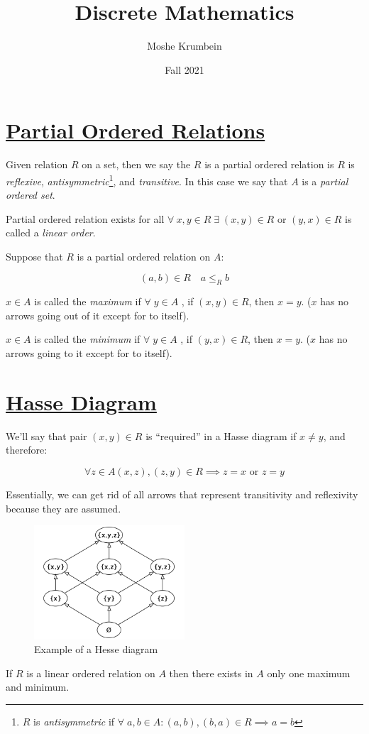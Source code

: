 \documentclass[00_complete]{subfiles}
\title{Discrete Mathematics}
\author{Moshe Krumbein}
\date{Fall 2021}
\begin{document}

\section{\href{https://en.wikipedia.org/wiki/Partially_ordered_set\#Partial_order_relation}{Partial Ordered Relations}}

Given relation \(R\) on a set, then we say the \(R\) is a partial
ordered relation is \(R\) is \emph{reflexive},
\emph{antisymmetric}\footnote{\(R\) is \emph{antisymmetric} if
  \(\forall \; a,b \in A: (a,b), (b,a) \in R \implies  a=b\)}, and
  \emph{transitive}. In this case we say that \(A\) is a \emph{partial
ordered set}.

\begin{definition}
Partial ordered relation exists for all
\(\forall \: x,y \in R \;\exists\; (x,y) \in R\) or \((y,x) \in R\) is
called a \emph{linear order}.
\end{definition}

Suppose that \(R\) is a partial ordered relation on \(A\):

\[(a,b) \in R \quad a \leq_R b\]

\(x \in A\) is called the \emph{maximum} if \(\forall \; y \in A\) , if
\((x,y) \in R\), then \(x=y\). (\(x\) has no arrows going out of it
except for to itself).

\(x \in A\) is called the \emph{minimum} if \(\forall \; y \in A\) , if
\((y,x) \in R\), then \(x=y\). (\(x\) has no arrows going to it except
for to itself).

\section{\href{https://en.wikipedia.org/wiki/Hasse_diagram}{Hasse
Diagram}}

We'll say that pair \((x,y) \in R\) is ``required'' in a Hasse diagram
if \(x \neq y\), and therefore:

\[\forall z \in A (x,z),(z,y) \in R \implies z=x \text{ or } z=y\]

Essentially, we can get rid of all arrows that represent transitivity and
reflexivity because they are assumed.

\begin{figure}[ht]
    \centering
    \includegraphics[width=0.5\textwidth]{w4-hesse}
    \caption{Example of a Hesse diagram}
\end{figure}

\begin{claim}
If \(R\) is a linear ordered relation on \(A\) then there exists in
\(A\) only one maximum and minimum.
\end{claim}
\end{document}
